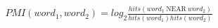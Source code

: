 \documentclass[10pt]{article}
\begin{document}
\begin{align*}PMI(word_1,word_2)=log_2{\frac{hits(word_1 \: \mathrm{NEAR} \: word_2)}{hits(word_1)hits(word_2)}}\end{align*}
\end{document}

